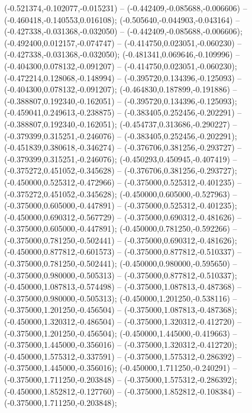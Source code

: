  (-0.521374,-0.102077,-0.015231) -- (-0.442409,-0.085688,-0.006606) -- (-0.460418,-0.140553,0.016108);
 (-0.505640,-0.044903,-0.043164) -- (-0.427338,-0.031368,-0.032050) -- (-0.442409,-0.085688,-0.006606);
 (-0.492400,0.012157,-0.074747) -- (-0.414750,0.023051,-0.060230) -- (-0.427338,-0.031368,-0.032050);
 (-0.481341,0.069646,-0.109996) -- (-0.404300,0.078132,-0.091207) -- (-0.414750,0.023051,-0.060230);
 (-0.472214,0.128068,-0.148994) -- (-0.395720,0.134396,-0.125093) -- (-0.404300,0.078132,-0.091207);
 (-0.464830,0.187899,-0.191886) -- (-0.388807,0.192340,-0.162051) -- (-0.395720,0.134396,-0.125093);
 (-0.459041,0.249613,-0.238875) -- (-0.383405,0.252456,-0.202291) -- (-0.388807,0.192340,-0.162051);
 (-0.454737,0.313686,-0.290227) -- (-0.379399,0.315251,-0.246076) -- (-0.383405,0.252456,-0.202291);
 (-0.451839,0.380618,-0.346274) -- (-0.376706,0.381256,-0.293727) -- (-0.379399,0.315251,-0.246076);
 (-0.450293,0.450945,-0.407419) -- (-0.375272,0.451052,-0.345628) -- (-0.376706,0.381256,-0.293727);
 (-0.450000,0.525312,-0.472966) -- (-0.375000,0.525312,-0.401235) -- (-0.375272,0.451052,-0.345628);
 (-0.450000,0.605000,-0.527963) -- (-0.375000,0.605000,-0.447891) -- (-0.375000,0.525312,-0.401235);
 (-0.450000,0.690312,-0.567729) -- (-0.375000,0.690312,-0.481626) -- (-0.375000,0.605000,-0.447891);
 (-0.450000,0.781250,-0.592266) -- (-0.375000,0.781250,-0.502441) -- (-0.375000,0.690312,-0.481626);
 (-0.450000,0.877812,-0.601573) -- (-0.375000,0.877812,-0.510337) -- (-0.375000,0.781250,-0.502441);
 (-0.450000,0.980000,-0.595650) -- (-0.375000,0.980000,-0.505313) -- (-0.375000,0.877812,-0.510337);
 (-0.450000,1.087813,-0.574498) -- (-0.375000,1.087813,-0.487368) -- (-0.375000,0.980000,-0.505313);
 (-0.450000,1.201250,-0.538116) -- (-0.375000,1.201250,-0.456504) -- (-0.375000,1.087813,-0.487368);
 (-0.450000,1.320312,-0.486504) -- (-0.375000,1.320312,-0.412720) -- (-0.375000,1.201250,-0.456504);
 (-0.450000,1.445000,-0.419663) -- (-0.375000,1.445000,-0.356016) -- (-0.375000,1.320312,-0.412720);
 (-0.450000,1.575312,-0.337591) -- (-0.375000,1.575312,-0.286392) -- (-0.375000,1.445000,-0.356016);
 (-0.450000,1.711250,-0.240291) -- (-0.375000,1.711250,-0.203848) -- (-0.375000,1.575312,-0.286392);
 (-0.450000,1.852812,-0.127760) -- (-0.375000,1.852812,-0.108384) -- (-0.375000,1.711250,-0.203848);
